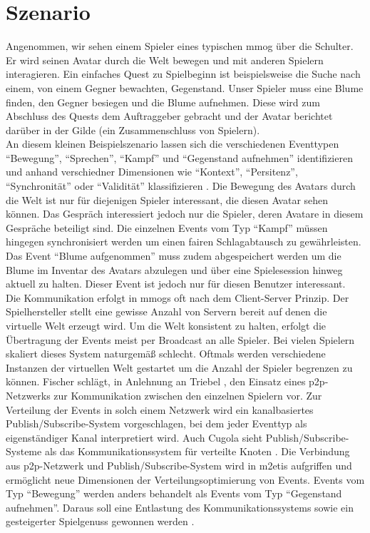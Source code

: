 \section{Szenario}
\label{chap:grundlagen:szenario}
Angenommen, wir sehen einem Spieler eines typischen \ac{mmog} über die Schulter. Er wird seinen Avatar durch die Welt bewegen und mit anderen Spielern interagieren. Ein einfaches Quest zu Spielbeginn ist beispielsweise die Suche nach einem, von einem Gegner bewachten, Gegenstand. Unser Spieler muss eine Blume finden, den Gegner besiegen und die Blume aufnehmen. Diese wird zum Abschluss des Quests dem Auftraggeber gebracht und der Avatar berichtet darüber in der Gilde (ein Zusammenschluss von Spielern).\\
An diesem kleinen Beispielszenario lassen sich die verschiedenen Eventtypen \enquote{Bewegung'', ``Sprechen'', ``Kampf'' und ``Gegenstand aufnehmen'' identifizieren und anhand verschiedner Dimensionen wie ``Kontext'', ``Persitenz'', ``Synchronität'' oder ``Validität'' klassifizieren \cite{Fischer2010Event}. Die Bewegung des Avatars durch die Welt ist nur für diejenigen Spieler interessant, die diesen Avatar sehen können. Das Gespräch interessiert jedoch nur die Spieler, deren Avatare in diesem Gespräche beteiligt sind. Die einzelnen Events vom Typ ``Kampf'' müssen hingegen synchronisiert werden um einen fairen Schlagabtausch zu gewährleisten. Das Event ``Blume aufgenommen} muss zudem abgespeichert werden um die Blume im Inventar des Avatars abzulegen und über eine Spielesession hinweg aktuell zu halten. Dieser Event ist jedoch nur für diesen Benutzer interessant.\\
Die Kommunikation erfolgt in \acp{mmog} oft nach dem Client-Server Prinzip. Der Spielhersteller stellt eine gewisse Anzahl von Servern bereit auf denen die virtuelle Welt erzeugt wird. Um die Welt konsistent zu halten, erfolgt die Übertragung der Events meist per Broadcast an alle Spieler. Bei vielen Spielern skaliert dieses System naturgemäß schlecht. Oftmals werden verschiedene Instanzen der virtuellen Welt gestartet um die Anzahl der Spieler begrenzen zu können. Fischer schlägt, in Anlehnung an Triebel \cite{Triebel2008Peertopeer}, den Einsatz eines \ac{p2p}-Netzwerks zur Kommunikation zwischen den einzelnen Spielern vor. Zur Verteilung der Events in solch einem Netzwerk wird ein kanalbasiertes Publish/Subscribe-System vorgeschlagen, bei dem jeder Eventtyp als eigenständiger Kanal interpretiert wird. Auch Cugola sieht Publish/Subscribe-Systeme als das Kommunikationssystem für verteilte Knoten \cite{Cugola2002Using}. Die Verbindung aus \ac{p2p}-Netzwerk und Publish/Subscribe-System wird in \ac{m2etis} aufgriffen und ermöglicht neue Dimensionen der Verteilungsoptimierung von Events. Events vom Typ \enquote{Bewegung'' werden anders behandelt als Events vom Typ ``Gegenstand aufnehmen}. Daraus soll eine Entlastung des Kommunikationssystems sowie ein gesteigerter Spielgenuss gewonnen werden  \cite{Fischer2010a}.
